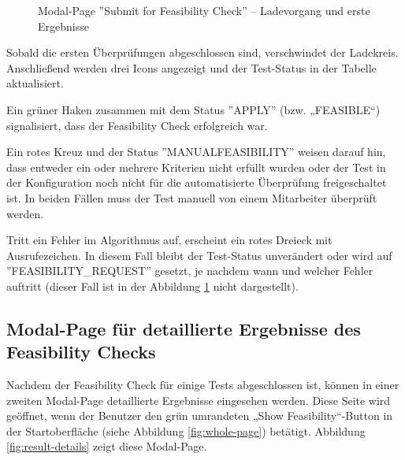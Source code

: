 \begin{figure}[!htbp] 
    \centering 
    \caption{Modal-Page ''Submit for Feasibility Check'' – Ladevorgang und erste Ergebnisse} 
    \label{fig:loading-with-results} 
\end{figure}

Sobald die ersten Überprüfungen abgeschlossen sind, verschwindet der Ladekreis. Anschließend werden drei Icons angezeigt und der Test-Status in der Tabelle aktualisiert.

Ein grüner Haken zusammen mit dem Status ''APPLY'' (bzw. „FEASIBLE“) signalisiert, dass der Feasibility Check erfolgreich war.

Ein rotes Kreuz und der Status ''MANUALFEASIBILITY'' weisen darauf hin, dass entweder ein oder mehrere Kriterien nicht erfüllt wurden oder der Test in der Konfiguration noch nicht für die automatisierte Überprüfung freigeschaltet ist. In beiden Fällen muss der Test manuell von einem Mitarbeiter überprüft werden.

Tritt ein Fehler im Algorithmus auf, erscheint ein rotes Dreieck mit Ausrufezeichen. In diesem Fall bleibt der Test-Status unverändert oder wird auf ''FEASIBILITY\_REQUEST'' gesetzt, je nachdem wann und welcher Fehler auftritt (dieser Fall ist in der Abbildung \ref{fig:loading-with-results} nicht dargestellt).


\subsection{Modal-Page für detaillierte Ergebnisse des Feasibility Checks}

Nachdem der Feasibility Check für einige Tests abgeschlossen ist, können in einer zweiten Modal-Page detaillierte Ergebnisse eingesehen werden. Diese Seite wird geöffnet, wenn der Benutzer den grün umrandeten „Show Feasibility“-Button in der Startoberfläche (siehe Abbildung \ref{fig:whole-page}) betätigt. Abbildung \ref{fig:result-details} zeigt diese Modal-Page.

